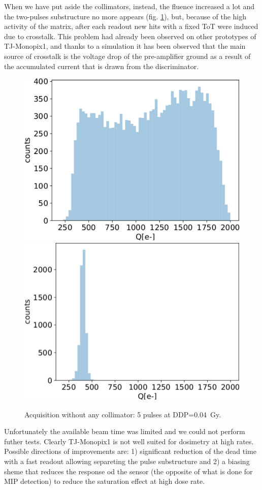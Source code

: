    When we have put aside the collimators, instead, the fluence increased a lot and the two-pulses substructure no more appears (fig. \ref{fig:without_collimator}), but, because of the high activity of the matrix, after each readout new hits with a fixed ToT were induced due to crosstalk.  
   This problem had already been observed on other prototypes of TJ-Monopix1, and thanks to a simulation it has been observed that the main source of crosstalk is the voltage drop of the pre-amplifier ground as a result of the accumulated current that is drawn from the discriminator.   
   \begin{figure}
      \centering
      \includegraphics[width=.49\linewidth]{figures/test_beam/Qe_17_32.pdf}
      \includegraphics[width=.49\linewidth]{figures/test_beam/noise_Qe_17_32.pdf}
      \caption{Acquisition without any collimator: 5 pulses at DDP=\SI{0.04}{Gy}.}
      \label{fig:without_collimator}
   \end{figure}
   Unfortunately the available beam time was limited and we could not perform futher tests. Clearly TJ-Monopix1 is not well suited for dosimetry at high rates. Possible directions of improvements are: 1) significant reduction of the dead time with a fast readout allowing separeting the pulse substructure and 2) a biasing sheme that reduces the response od the sensor (the opposite of what is done for MIP detection) to reduce the saturation effect at high dose rate. 



   